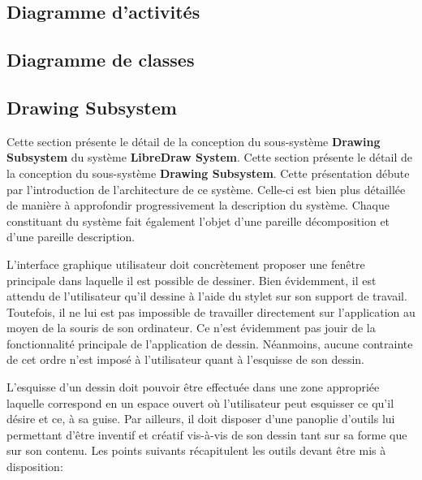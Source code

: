 \documentclass[11pt,a4paper,oldfontcommands]{memoir}
\begin{document}
\newpage

\subsection{Diagramme d'activités}

\subsection{Diagramme de classes}

\newpage

\subsection{Drawing Subsystem}

Cette section présente le détail de la conception du sous-système \textbf{Drawing Subsystem} du système \textbf{LibreDraw System}. Cette section présente le détail de la conception du sous-système \textbf{Drawing Subsystem}. Cette présentation débute par l'introduction de l'architecture de ce système. Celle-ci est bien plus détaillée de manière à approfondir progressivement la description du système. Chaque constituant du système fait également l'objet d'une pareille décomposition et d'une pareille description.

L'interface graphique utilisateur doit concrètement proposer une fenêtre principale dans laquelle il est possible de dessiner. Bien évidemment, il est attendu de l'utilisateur qu'il dessine à l'aide du stylet sur son support de travail. Toutefois, il ne lui est pas impossible de travailler directement sur l'application au moyen de la souris de son ordinateur. Ce n'est évidemment pas jouir de la fonctionnalité principale de l'application de dessin. Néanmoins, aucune contrainte de cet ordre n'est imposé à l'utilisateur quant à l'esquisse de son dessin.

L'esquisse d'un dessin doit pouvoir être effectuée dans une zone appropriée laquelle correspond en un espace ouvert où l'utilisateur peut esquisser ce qu'il désire et ce, à sa guise. Par ailleurs, il doit disposer d'une panoplie d'outils lui permettant d'être inventif et créatif vis-à-vis de son dessin tant sur sa forme que sur son contenu. Les points suivants récapitulent les outils devant être mis à disposition:
\end{document}
